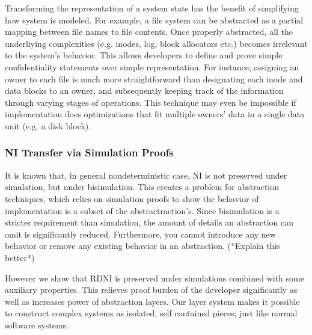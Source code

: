 \documentclass[onecolumn]{paper}
\begin{document}
Transforming the representation of a system state has the benefit of simplifying how system is modeled. For example, a file system can be abstracted as a partial mapping between file names to file contents. Once properly abstracted, all the underliying complexities (e.g. inodes, log, block allocators etc.) becomes irrelevant to the system's behavior. This allows developers to define and prove simple confidentiality statements over simple representation. For instance, assigning an owner to each file is much more straightforward than designating each inode and data blocks to an owner, and subsequently keeping track of the information through varying stages of operations. This technique may even be impossible if implementation does optimizations that fit multiple owners' data in a single data unit (e.g. a disk block).

\subsubsection*{NI Transfer via Simulation Proofs}
It is known that, in general nondeterministic case, NI is not preserved under simulation, but under bisimulation. This creates a problem for abstraction techniques, which relies on simulation proofs to show the behavior of implementation is a subset of the abstractraction's. Since bisimulation is a stricter requirement than simulation, the amount of details an abstraction can omit is significantly reduced. Furthermore, you cannot introduce any new behavior or remove any existing behavior in an abstraction. (*Explain this better*)

However we show that RDNI is preserved under simulations combined with some auxiliary properties. This relieves proof burden of the developer significantly as well as increases power of abstraction layers. Our layer system makes it possible to construct complex systems as isolated, self contained pieces; just like normal software systems.

\end{document}
